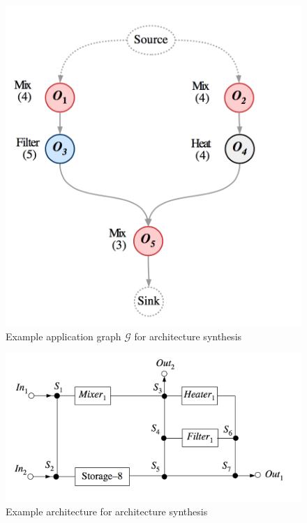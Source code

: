 \begin{figure}[H]
\centering
\includegraphics[scale=0.3]{figures/application-model.png}
\caption[Example application graph $\mathcal{G}$ for architecture synthesis]{Example application graph $\mathcal{G}$ for architecture synthesis}
\label{fig:arch-syn-application}
\end{figure}

\begin{figure}[H]
\centering
\includegraphics[scale=0.3]{figures/architecture.png}
\caption[Example architecture for architecture synthesis]{Example architecture for architecture synthesis}
\label{fig:arch-syn-arch}
\end{figure}

